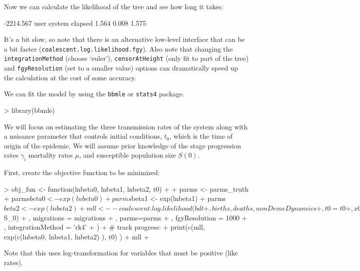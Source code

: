 \documentclass{article}
\begin{document}
Now we can calculate the likelihood of the tree and see how long it takes:
\begin{Schunk}
\begin{Soutput}
[1] -2214.567
   user  system elapsed 
  1.564   0.008   1.575 
\end{Soutput}
\end{Schunk}
It's a bit slow, so note that there is an alternative low-level interface that can be a bit faster (\texttt{coalescent.log.likelihood.fgy}). Also note that changing the \texttt{integrationMethod} (choose `euler'), \texttt{censorAtHeight} (only fit to part of the tree) and \texttt{fgyResolution} (set to a smaller value) options can dramatically speed up the calculation at the cost of some accuracy. 

We can fit the model by using the \texttt{bbmle} or \texttt{stats4} package. 
\begin{Schunk}
\begin{Sinput}
> library(bbmle)
\end{Sinput}
\end{Schunk}
We will focus on estimating the three transmission rates of the system along with a nuisance parameter that controls initial conditions, $t_0$, which is the time of origin of the epidemic. We will assume prior knowledge of the stage progression rates $\gamma_i$ mortality rates $\mu$, and susceptible population size $S(0)$.


First, create the objective function to be minimized:
\begin{Schunk}
\begin{Sinput}
> obj_fun <- function(lnbeta0, lnbeta1, lnbeta2, t0)
+ {
+ 	parms <- parms_truth
+ 	parms$beta0 <- exp(lnbeta0)
+ 	parms$beta1 <- exp(lnbeta1)
+ 	parms$beta2 <- exp(lnbeta2)
+ 	mll <- -coalescent.log.likelihood( bdt
+ 		 , births, deaths, nonDemeDynamics
+ 		 , t0 = t0
+ 		 , x0=c(I0=1, I1=.01, I2=.01, S = parms$S_0)
+ 		 , migrations = migrations
+ 		 , parms=parms
+ 		 , fgyResolution = 1000
+ 		 , integrationMethod = 'rk4'
+ 	)
+ 	# track progress: 
+ 	print(c(mll, exp(c(lnbeta0, lnbeta1, lnbeta2) ), t0) )
+ 	mll
+ }
\end{Sinput}
\end{Schunk}
Note that this uses log-transformation for variables that must be positive (like rates).
\end{document}

